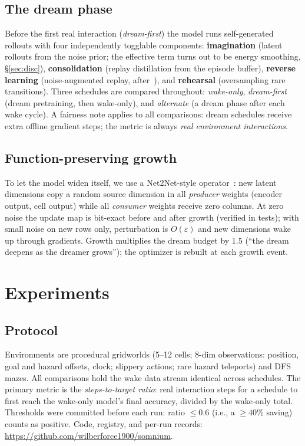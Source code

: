 \documentclass[11pt,a4paper]{article}
\begin{document}
\subsection{The dream phase}\label{sec:dreamphase}

Before the first real interaction (\emph{dream-first}) the model runs self-generated rollouts with four independently togglable components: \textbf{imagination} (latent rollouts from the noise prior; the effective term turns out to be energy smoothing, \S\ref{sec:disc}), \textbf{consolidation} (replay distillation from the episode buffer), \textbf{reverse learning} (noise-augmented replay, after~\cite{crick1983,shin2017}), and \textbf{rehearsal} (oversampling rare transitions). Three schedules are compared throughout: \emph{wake-only}, \emph{dream-first} (dream pretraining, then wake-only), and \emph{alternate} (a dream phase after each wake cycle). A fairness note applies to all comparisons: dream schedules receive extra offline gradient steps; the metric is always \emph{real environment interactions}.

\subsection{Function-preserving growth}

To let the model widen itself, we use a Net2Net-style operator~\cite{wei2016}: new latent dimensions copy a random source dimension in all \emph{producer} weights (encoder output, cell output) while all \emph{consumer} weights receive zero columns. At zero noise the update map is bit-exact before and after growth (verified in tests); with small noise on new rows only, perturbation is $O(\varepsilon)$ and new dimensions wake up through gradients. Growth multiplies the dream budget by 1.5 (``the dream deepens as the dreamer grows''); the optimizer is rebuilt at each growth event.

\section{Experiments}\label{sec:exp}

\subsection{Protocol}

Environments are procedural gridworlds (5--12 cells; 8-dim observations: position, goal and hazard offsets, clock; slippery actions; rare hazard teleports) and DFS mazes. All comparisons hold the wake data stream identical across schedules. The primary metric is the \emph{steps-to-target ratio}: real interaction steps for a schedule to first reach the wake-only model's final accuracy, divided by the wake-only total. Thresholds were committed before each run: ratio $\le 0.6$ (i.e., a ${\ge}40\%$ saving) counts as positive. Code, registry, and per-run records: \url{https://github.com/wilberforce1900/somnium}.
\end{document}
